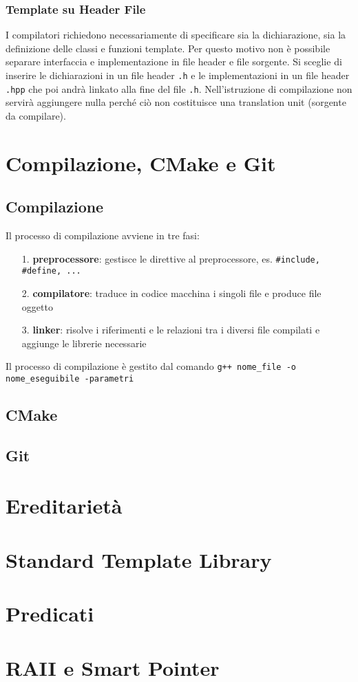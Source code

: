 \documentclass[a4paper]{article}
\begin{document}
\subsubsection*{Template su Header File}
I compilatori richiedono necessariamente di specificare sia la dichiarazione, sia la definizione delle classi e funzioni template.
Per questo motivo non è possibile separare interfaccia e implementazione in file header e file sorgente. Si sceglie di
inserire le dichiarazioni in un file header \verb|.h| e le implementazioni in un file header \verb|.hpp| che poi andrà linkato
alla fine del file \verb|.h|. Nell'istruzione di compilazione non servirà aggiungere nulla perché ciò non costituisce una
translation unit (sorgente da compilare).

\newpage

\section{Compilazione, CMake e Git}
\subsection{Compilazione}
Il processo di compilazione avviene in tre fasi:
\begin{itemize}
	\item[1.] \textbf{preprocessore}: gestisce le direttive al preprocessore, es. \verb|#include, #define, ...|
	\item[2.] \textbf{compilatore}: traduce in codice macchina i singoli file e produce file oggetto
	\item[3.] \textbf{linker}: risolve i riferimenti e le relazioni tra i diversi file compilati e aggiunge le librerie necessarie
\end{itemize}
Il processo di compilazione è gestito dal comando \verb|g++ nome_file -o nome_eseguibile -parametri|

\subsection{CMake}
\subsection{Git}

\section{Ereditarietà}
\section{Standard Template Library}
\section{Predicati}
\section{RAII e Smart Pointer}
\end{document}
